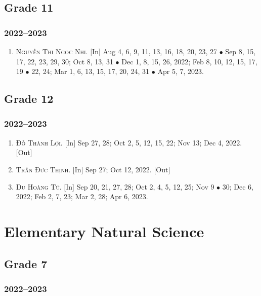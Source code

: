 \documentclass{article}
\begin{document}
\subsection{Grade 11}

\subsubsection{2022--2023}

\begin{enumerate}
	\item \textsc{Nguyễn Thị Ngọc Nhi.} \textsf{[In]} Aug 4, 6, 9, 11, 13, 16, 18, 20, 23, 27 $\bullet$ Sep 8, 15, 17, 22, 23, 29, 30; Oct 8, 13, 31 $\bullet$ Dec 1, 8,  15, 26, 2022; Feb 8, 10, 12, 15, 17, 19 $\bullet$ 22, 24; Mar 1, 6, 13, 15, 17, 20, 24, 31 $\bullet$ Apr 5, 7, 2023.
\end{enumerate}

\subsection{Grade 12}

\subsubsection{2022--2023}

\begin{enumerate}
	\item \textsc{Đỗ Thành Lợi.} \textsf{[In]} Sep 27, 28; Oct 2, 5, 12, 15, 22; Nov 13; Dec 4, 2022. \textsf{[Out]}
	\item \textsc{Trần Đức Thịnh.} \textsf{[In]} Sep 27; Oct 12, 2022.  \textsf{[Out]}
	\item \textsc{Du Hoàng Tú.} \textsf{[In]} Sep 20, 21, 27, 28; Oct 2, 4, 5, 12, 25; Nov 9 $\bullet$ 30; Dec 6, 2022; Feb 2, 7, 23; Mar 2, 28; Apr 6, 2023.
\end{enumerate}


\section{Elementary Natural Science}

\subsection{Grade 7}

\subsubsection{2022--2023}
\end{document}
